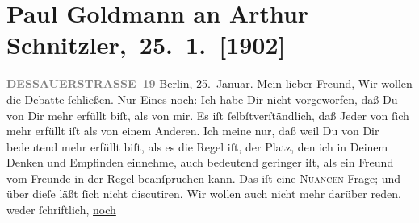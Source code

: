 

         
         \renewcommand{\erwaehntePersonen}{Personen: Richard Beer-Hofmann, Emerich von Bukovics, Paul Goldmann, Theodor Herzl, Heinrich Kanner, Fedor Mamroth, Paul Schlenther, Olga Schnitzler, Émile Zola}
         \renewcommand{\erwaehnteInstitutionen}{Institutionen: Burgtheater, Deutsches Theater Berlin, Die Zeit, Volkstheater}
         \renewcommand{\erwaehnteOrte}{Orte: Berlin, Dessauer Straße, Frankfurt am Main, Frankreich, Rodaun, Wien}
         \renewcommand{\erwaehnteWerke}{Werke: Berliner Theater. (»Lebendige Stunden« von Arthur Schnitzler.), Der Schleier der Beatrice. Schauspiel in fünf Akten, Lebendige Stunden. Vier Einakter, Neue Freie Presse, Tagebuch}
               \section[ Paul Goldmann an Arthur Schnitzler, 25. 1. {[}1902{]}]{ Paul Goldmann an Arthur Schnitzler, 25. 1. {[}1902{]}}\nopagebreak{}\rehead{ }\begin{ledgroupsized}[t]{13cm}\normalsize\beginnumbering \toendnotes[C]{\smallbreak\pagebreak[2]} 
\toendnotes[C]{\smallbreak}\pstart
           \noindent{}\raggedleft{}{\pb}\textcolor{gray}{\textbf{DESSAUERSTRASSE 19}}\pend
           \pstart
           Berlin, 25. Januar.\pend
           \pstart\center{}Mein lieber Freund,\pend\pstart
           Wir wollen die Debatte ſchließen. Nur Eines noch: Ich habe Dir nicht vorgeworfen, daß
               Du von Dir mehr erfüllt biſt, als von mir. Es iſt ſelbſtverſtändlich, daß Jeder von
               ſich mehr erfüllt iſt als von einem Anderen. Ich meine nur, daß \strikeout{\textcolor{gray}{ich in Deinen}} weil Du von Dir bedeutend mehr erfüllt biſt, als es die Regel iſt, der Platz,
               den ich in Deinem Denken und Empfinden einnehme, auch bedeutend geringer iſt, als ein
               Freund vom Freunde in der Regel beanſpruchen kann. Das iſt eine \textsc{Nuancen}-Frage; und über dieſe läßt ſich nicht discutiren. Wir wollen auch
               nicht mehr darüber reden, weder ſchriftlich, \uline{noch
}
\end{ledgroupsized}
